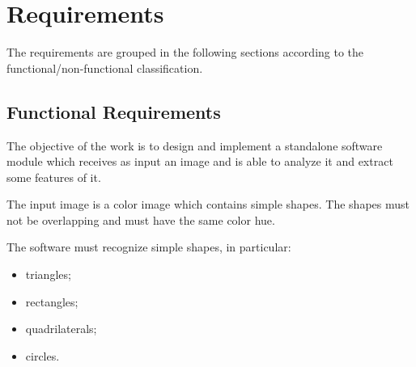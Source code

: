 	\section{Requirements}
	The requirements are grouped in the following sections according to the functional/non-functional classification. 

		\subsection{Functional Requirements}
		The objective of the work is to design and implement a standalone software module which receives as input an image and is able to analyze it and extract some features of it.

		The input image is a color image which contains simple shapes. The shapes must not be overlapping and must have the same color hue.

		The software must recognize simple shapes, in particular:
		\begin{itemize}
	    		\item triangles;
			\item rectangles;
			\item quadrilaterals;
			\item circles.
		\end{itemize}

